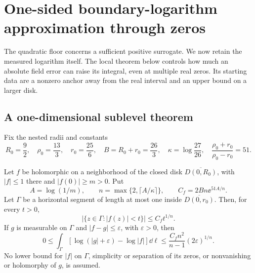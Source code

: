 \section{One-sided boundary-logarithm approximation through zeros}\label{sec:boundary-log}

The quadratic floor concerns a sufficient positive surrogate. We now
retain the measured logarithm itself. The local theorem below controls
how much an absolute field error can raise its integral, even at
multiple real zeros. Its starting data are a nonzero anchor away
from the real interval and an upper bound on a larger disk.

\subsection{A one-dimensional sublevel theorem}

Fix the nested radii and constants
\begin{equation}\label{eq:disk-constants}
 R_0=\frac92,\quad \rho_0=\frac{13}3,\quad r_0=\frac{25}6,\quad
 B=R_0+r_0=\frac{26}3,\quad
 \kappa=\log\frac{27}{26},\quad
 \frac{\rho_0+r_0}{\rho_0-r_0}=51 .
\end{equation}

\begin{theorem}\label{thm:local-log}
Let \(f\) be holomorphic on a neighborhood of the closed disk
\(\overline{D(0,R_0)}\), with \(|f|\le1\) there and
\(|f(0)|\ge m>0\). Put
\begin{equation}\label{eq:n-C}
 A=\log(1/m),\qquad
 n=\max\{2,\lceil A/\kappa\rceil\},\qquad
 C_f=2Bn\ee^{51A/n}.
\end{equation}
Let \(\Gamma\) be a horizontal segment of length at most one inside
\(\overline{D(0,r_0)}\). Then, for every \(t>0\),
\begin{equation}\label{eq:sublevel}
 |\{z\in\Gamma:|f(z)|<t\}|\le C_ft^{1/n}.
\end{equation}
If \(g\) is measurable on \(\Gamma\) and
\(|f-g|\le\varepsilon\), with \(\varepsilon>0\), then
\begin{equation}\label{eq:local-envelope}
 0\le\int_\Gamma
       [\log(|g|+\varepsilon)-\log|f|]\dd\ell
 \le\frac{C_fn^2}{n-1}(2\varepsilon)^{1/n}.
\end{equation}
No lower bound for \(|f|\) on \(\Gamma\), simplicity or separation
of its zeros, or nonvanishing or holomorphy of \(g\), is assumed.
\end{theorem}

